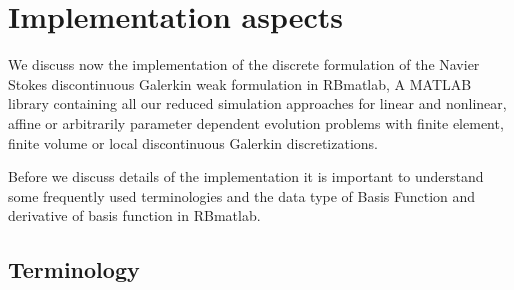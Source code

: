 \documentclass[a4paper,12pt]{book}
\begin{document}
\chapter{Implementation aspects} \label{implementation_aspects}

We discuss now the implementation of the discrete formulation of the Navier Stokes discontinuous Galerkin weak formulation in RBmatlab, A MATLAB library containing all our reduced simulation approaches for linear and nonlinear, affine or arbitrarily parameter dependent evolution problems with finite element, finite volume or local discontinuous Galerkin discretizations. \cite{Haasdonk_book} 

Before we discuss details of the implementation it is important to understand some frequently used terminologies and the data type of Basis Function and derivative of basis function in RBmatlab.

\section{Terminology}
\end{document}
